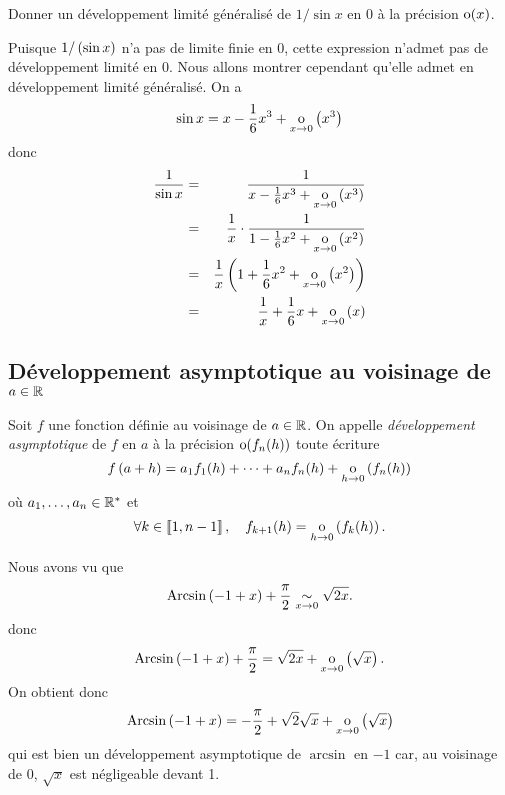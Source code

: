 \documentclass{magnoliaold}
\begin{document}
\begin{exoUnique}
\exo Donner un développement limité généralisé de $1/\sin x$ en 0 à
  la précision ${\rm o}(x)$.
  \begin{sol}
  Puisque $1/\left(\sin x\right)$ n'a pas de limite finie en 0, cette expression
  n'admet pas de développement limité en 0. Nous allons montrer cependant
  qu'elle admet en développement limité généralisé. On a
  \[\sin x=x-\frac{1}{6}x^3+\underset{x \rightarrow 0}{\text{o}}\left(x^3\right)\]
  donc
  \begin{eqnarray*}
  \frac{1}{\sin x}
  &=& \frac{1}{x-\frac{1}{6}x^3+\underset{x \rightarrow 0}{\text{o}}\left(x^3\right)}\\
  &=& \frac{1}{x}\cdot\frac{1}{1-\frac{1}{6}x^2+\underset{x \rightarrow 0}{\text{o}}\left(x^2\right)}\\
  &=& \frac{1}{x}\left(1+\frac{1}{6}x^2+\underset{x \rightarrow 0}{\text{o}}\left(x^2\right)\right)\\
  &=& \frac{1}{x}+\frac{1}{6}x+\underset{x \rightarrow 0}{\text{o}}\left(x\right)
  \end{eqnarray*}    
  \end{sol}
\end{exoUnique}


\subsection{Développement asymptotique au voisinage de $a\in\mathbb{R}$}

\begin{definition}[utile=-3]
Soit $f$ une fonction définie au voisinage de $a\in\mathbb{R}$. On appelle \emph{développement
asymptotique} de $f$ en $a$ à la précision ${\rm o}(f_n(h))$ toute écriture
\[f\left(a+h\right)=a_1 f_1(h)+\cdots+a_n f_n(h)+\underset{h \rightarrow 0}{\text{o}}\left(f_n(h)\right)\]
où $a_1,\ldots,a_n\in{\mathbb{R}^*}$ et
\[\forall k\in\left\llbracket 1,n-1\right\rrbracket ,\quad f_{k+1}(h)=\underset{h \rightarrow 0}{\text{o}}\left(f_k(h)\right).\]
\end{definition}

\begin{remarqueUnique}
\remarque Nous avons vu que
  \[\operatorname{Arcsin}\left(-1+x\right)+\frac{\pi}{2}\underset{x\rightarrow 0}{\sim}\sqrt{2x}.\]
  donc
  \[\operatorname{Arcsin}\left(-1+x\right)+\frac{\pi}{2}=\sqrt{2x}+\underset{x \rightarrow 0}{\text{o}}\left(\sqrt{x}\right).\]
  On obtient donc
  \[\operatorname{Arcsin}\left(-1+x\right)=-\frac{\pi}{2}+\sqrt{2}\sqrt{x}+\underset{x \rightarrow 0}{\text{o}}\left(\sqrt{x}\right)\]
  qui est bien un développement asymptotique de $\arcsin$ en $-1$ car, au
  voisinage de 0, $\sqrt{x}$ est négligeable devant 1.
\end{remarqueUnique}
\end{document}
